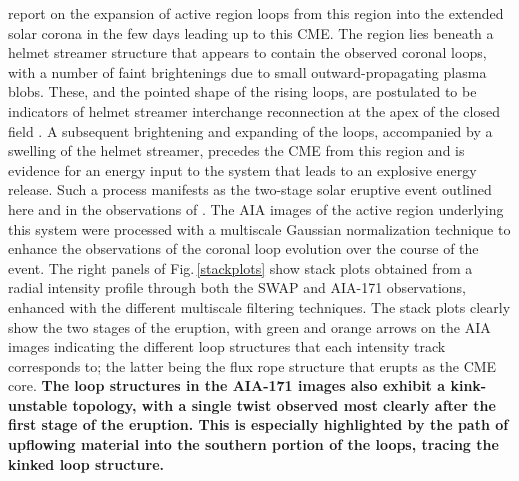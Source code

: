 \documentclass[namedreferences]{solarphysics}
\begin{document}
\begin{article}
 report on the expansion of active region loops from this region into the extended solar corona in the few days leading up to this CME. The region lies beneath a helmet streamer structure that appears to contain the observed coronal loops, with a number of faint brightenings due to small outward-propagating plasma blobs. These, and the pointed shape of the rising loops, are postulated to be indicators of helmet streamer interchange reconnection at the apex of the closed field \cite{2012ApJ...749..182W}. A subsequent brightening and expanding of the loops, accompanied by a swelling of the helmet streamer, precedes the CME from this region and is evidence for an energy input to the system that leads to an explosive energy release. Such a process manifests as the two-stage solar eruptive event outlined here and in the observations of . The AIA images of the active region underlying this system were processed with a multiscale Gaussian normalization technique \cite{MorganDruckmuller_inreview} to enhance the observations of the coronal loop evolution over the course of the event. The right panels of Fig.\,\ref{stackplots} show stack plots obtained from a radial intensity profile through both the SWAP and AIA-171 observations, enhanced with the different multiscale filtering techniques. The stack plots clearly show the two stages of the eruption, with green and orange arrows on the AIA images indicating the different loop structures that each intensity track corresponds to; the latter being the flux rope structure that erupts as the CME core. {\bf The loop structures in the AIA-171 images also exhibit a kink-unstable topology, with a single twist observed most clearly after the first stage of the eruption. This is especially highlighted by the path of upflowing material into the southern portion of the loops, tracing the kinked loop structure.}	 


\end{article}
\end{document}
